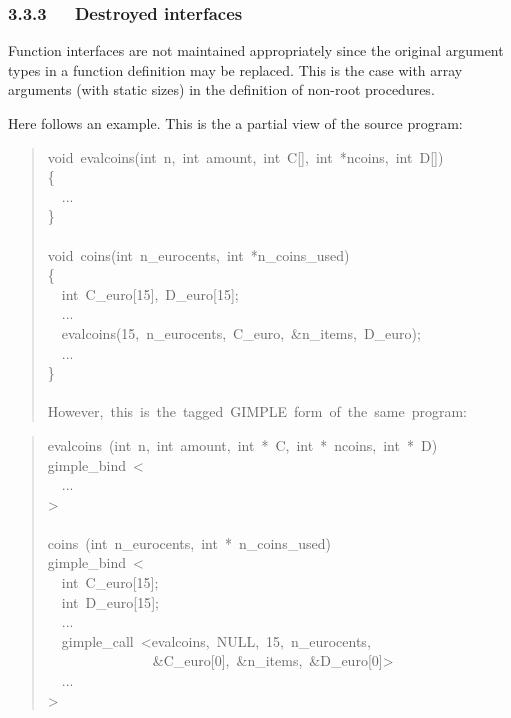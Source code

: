 \documentclass[a4paper]{article}
\begin{document}
\subsubsection{3.3.3~~~Destroyed interfaces%
  \label{destroyed-interfaces}%
}

Function interfaces are not maintained appropriately since the original
argument types in a function definition may be replaced. This is the case
with array arguments (with static sizes) in the definition of non-root
procedures.

Here follows an example. This is the a partial view of the source program:
%
\begin{quote}{\ttfamily \raggedright \noindent
void~evalcoins(int~n,~int~amount,~int~C{[}{]},~int~*ncoins,~int~D{[}{]})\\
\{\\
~~...\\
\}\\
~\\
void~coins(int~n\_eurocents,~int~*n\_coins\_used)\\
\{\\
~~int~C\_euro{[}15{]},~D\_euro{[}15{]};\\
~~...\\
~~evalcoins(15,~n\_eurocents,~C\_euro,~\&n\_items,~D\_euro);\\
~~...\\
\}\\
~\\
However,~this~is~the~tagged~GIMPLE~form~of~the~same~program:
}
\end{quote}
%
\begin{quote}{\ttfamily \raggedright \noindent
evalcoins~(int~n,~int~amount,~int~*~C,~int~*~ncoins,~int~*~D)\\
gimple\_bind~<\\
~~...\\
>\\
~\\
coins~(int~n\_eurocents,~int~*~n\_coins\_used)\\
gimple\_bind~<\\
~~int~C\_euro{[}15{]};\\
~~int~D\_euro{[}15{]};\\
~~...\\
~~gimple\_call~<evalcoins,~NULL,~15,~n\_eurocents,\\
~~~~~~~~~~~~~~~\&C\_euro{[}0{]},~\&n\_items,~\&D\_euro{[}0{]}>\\
~~...\\
>
}
\end{quote}
\end{document}
